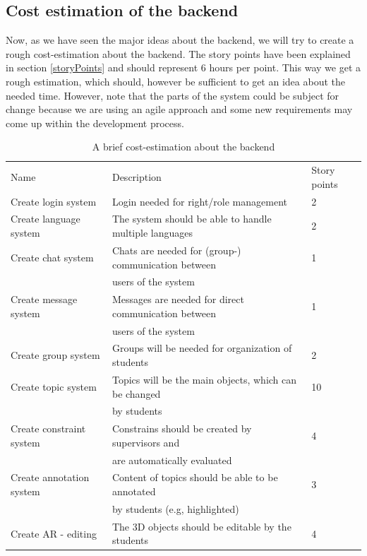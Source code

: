 \subsection{Cost estimation of the backend}
Now, as we have seen the major ideas about the backend, we will try to create a rough cost-estimation about the backend. The story points have been explained in section \ref{storyPoints} and should represent 6 hours per point. This way we get a rough estimation, which should, however be sufficient to get an idea about the needed time. However, note that the parts of the system could be subject for change because we are using an agile approach and some new requirements may come up within the development process.

 \begin{table}[h]
\scriptsize
 \caption{A brief cost-estimation about the backend}
 \begin{tabular}{lll}
	\toprule
  Name & Description & Story points \\ 
\cmidrule(rl){1-1}\cmidrule(rl){2-2}\cmidrule(rl){3-3}
	Create login system		&	Login needed for right/role management			&	2 \\	
	Create language system	&	The system should be able to handle multiple languages&	2 \\	
	Create chat system		&	Chats are needed for (group-) communication between &	1 \\	
		 				&	users of the system 							&	 \\	
	Create message system &	Messages are needed for direct communication between&	1 \\
	 					&	users of the system 							&	 \\		
  	Create group system 	& 	Groups will be needed for organization of students 	& 	2 \\
  	Create topic system 	& 	Topics will be the main objects, which can be changed  	& 	10 \\
  	 					& 	by students  								 	&	   \\
	Create constraint system  &	Constrains should be created by supervisors and 		&	4 \\
						&	are automatically evaluated						&	   \\	
  	Create annotation system & 	Content of topics should be able to be annotated  		& 	3 \\
  	 					& 	by students  (e.g, highlighted)						&	   \\
  	Create \ac{AR} - editing  & 	The 3D objects should be editable by the students 	& 	4 \\

\end{tabular}
\end{table}
